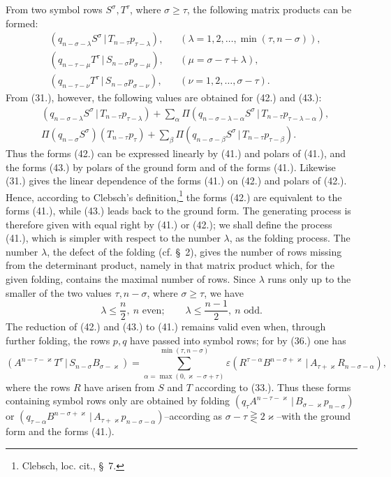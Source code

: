 \documentclass[11pt]{article}
\newcommand{\pair}[2]{(#1\,|\,#2)}
\newcommand{\eps}{\varepsilon}
\begin{document}
From two symbol rows $S^\sigma,T^\tau$, where $\sigma\ge\tau$, the following matrix products can be formed:
\begin{align}
&\pair{q_{n-\sigma-\lambda}S^\sigma}{T_{n-\tau}p_{\tau-\lambda}}, &&(\lambda=1,2,\ldots,\min(\tau,n-\sigma)),\tag{41}\\
&\pair{q_{n-\tau-\mu}T^\tau}{S_{n-\sigma}p_{\sigma-\mu}}, &&(\mu=\sigma-\tau+\lambda),\tag{42}\\
&\pair{q_{n-\tau-\nu}T^\tau}{S_{n-\sigma}p_{\sigma-\nu}}, &&(\nu=1,2,\ldots,\sigma-\tau).
\tag{43}
\end{align}
From (31.), however, the following values are obtained for (42.) and (43.):
\begin{align}
&\pair{q_{n-\sigma-\lambda}S^\sigma}{T_{n-\tau}p_{\tau-\lambda}}
 +\sum_{\alpha}\Pi\pair{q_{n-\sigma-\lambda-\alpha}S^\sigma}{T_{n-\tau}p_{\tau-\lambda-\alpha}},\tag{42a}\\
&\Pi(q_{n-\sigma}S^\sigma)(T_{n-\tau}p_\tau)
 +\sum_{\beta}\Pi\pair{q_{n-\sigma-\beta}S^\sigma}{T_{n-\tau}p_{\tau-\beta}}.
\tag{43a}
\end{align}
Thus the forms (42.) can be expressed linearly by (41.) and polars of (41.), and the forms (43.) by polars of the ground form and of the forms (41.). Likewise (31.) gives the linear dependence of the forms (41.) on (42.) and polars of (42.). Hence, according to Clebsch's definition,\footnote{Clebsch, loc. cit., \S\ 7.} the forms (42.) are equivalent to the forms (41.), while (43.) leads back to the ground form. The generating process is therefore given with equal right by (41.) or (42.); we shall define the process (41.), which is simpler with respect to the number $\lambda$, as the folding process. The number $\lambda$, the defect of the folding (cf. \S\ 2), gives the number of rows missing from the determinant product, namely in that matrix product which, for the given folding, contains the maximal number of rows. Since $\lambda$ runs only up to the smaller of the two values $\tau,n-\sigma$, where $\sigma\ge\tau$, we have
\begin{equation}
 \lambda\le\frac n2,\ n\text{ even};\qquad
 \lambda\le\frac{n-1}{2},\ n\text{ odd}.
\tag{44}
\end{equation}
The reduction of (42.) and (43.) to (41.) remains valid even when, through further folding, the rows $p,q$ have passed into symbol rows; for by (36.) one has
\[
 \pair{A^{n-\tau-\varkappa}T^\tau}{S_{n-\sigma}B_{\sigma-\varkappa}}
 =\sum_{\alpha=\max(0,\varkappa-\sigma+\tau)}^{\min(\tau,n-\sigma)}
 \eps\pair{R^{\tau-\alpha}B^{n-\sigma+\varkappa}}{A_{\tau+\varkappa}R_{n-\sigma-\alpha}},
\]
where the rows $R$ have arisen from $S$ and $T$ according to (33.). Thus these forms containing symbol rows only are obtained by folding $\pair{q_\tau A^{n-\tau-\varkappa}}{B_{\sigma-\varkappa}p_{n-\sigma}}$ or $\pair{q_{\tau-\alpha}B^{n-\sigma+\varkappa}}{A_{\tau+\varkappa}p_{n-\sigma-\alpha}}$--according as $\sigma-\tau\gtreqless 2\varkappa$--with the ground form and the forms (41.).
\end{document}
